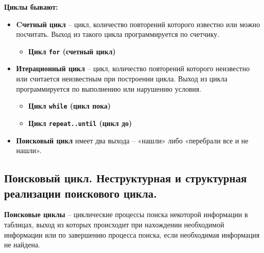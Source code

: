 \noindent
{\bf{Циклы бывают:}} 

\begin{itemize}

    \item {\bf{Cчетный цикл}} – цикл, количество повторений которого известно или можно посчитать. Выход из такого цикла программируется по счетчику.
    
    \begin{itemize}
        \item {\bf{Цикл \texttt{for} (счетный цикл)}}
    \end{itemize}

    \item {\bf{Итерационный цикл}} – цикл, количество повторений которого неизвестно или считается неизвестным при построении цикла. 
    Выход из цикла программируется по выполнению или нарушению условия.
    
    \begin{itemize}
        \item {\bf{Цикл \texttt{while} (цикл пока)}}
        
        \item {\bf{Цикл \texttt{repeat..until} (цикл до)}}
    \end{itemize}

    \item {\bf{Поисковый цикл}} имеет два выхода – «нашли» либо «перебрали все и не нашли».

\end{itemize}




\newpage\subsection{Поисковый цикл. Неструктурная и структурная реализации поискового цикла. }

\begin{myquote}
\end{myquote}


{\bf{Поисковые циклы}} – циклические процессы поиска некоторой информации в таблицах, выход из которых происходит при нахождении необходимой информации или по завершению процесса поиска, если необходимая информация не найдена.

